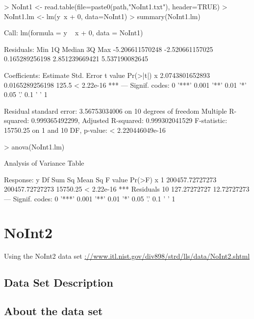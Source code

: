 \documentclass[10pt]{article}
\begin{document}
\begin{Schunk}
\begin{Sinput}
> NoInt1 <- read.table(file=paste0(path,"NoInt1.txt"), header=TRUE)
> NoInt1.lm <- lm(y~x + 0, data=NoInt1)
> summary(NoInt1.lm)
\end{Sinput}
\begin{Soutput}
Call:
lm(formula = y ~ x + 0, data = NoInt1)

Residuals:
            Min              1Q          Median              3Q             Max 
-5.206611570248 -2.520661157025  0.165289256198  2.851239669421  5.537190082645 

Coefficients:
         Estimate      Std. Error t value   Pr(>|t|)    
x 2.0743801652893 0.0165289256198   125.5 < 2.22e-16 ***
---
Signif. codes:  0 '***' 0.001 '**' 0.01 '*' 0.05 '.' 0.1 ' ' 1

Residual standard error: 3.56753034006 on 10 degrees of freedom
Multiple R-squared:  0.999365492299,	Adjusted R-squared:  0.999302041529 
F-statistic:      15750.25 on 1 and 10 DF,  p-value: < 2.220446049e-16
\end{Soutput}
\begin{Sinput}
> anova(NoInt1.lm)
\end{Sinput}
\begin{Soutput}
Analysis of Variance Table

Response: y
          Df          Sum Sq         Mean Sq  F value     Pr(>F)    
x          1 200457.72727273 200457.72727273 15750.25 < 2.22e-16 ***
Residuals 10    127.27272727     12.72727273                        
---
Signif. codes:  0 '***' 0.001 '**' 0.01 '*' 0.05 '.' 0.1 ' ' 1
\end{Soutput}
\end{Schunk}

\section{NoInt2}
Using the NoInt2 data set \url{://www.itl.nist.gov/div898/strd/lls/data/NoInt2.shtml}

\subsection*{Data Set Description}



\subsection*{About the data set}
\end{document}
